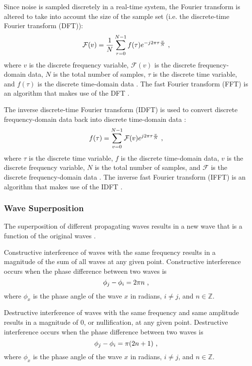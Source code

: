 \documentclass[11pt]{article}
\begin{document}
Since noise is sampled discretely in a real-time system, the Fourier transform is altered to take into account the size of the sample set (i.e. the discrete-time Fourier transform (DFT)):
\begin{equation}
    \mathcal{F}(v) = \frac{1}{N} \sum \limits_{\tau = 0}^{N - 1} f(\tau) e^{-j 2 \pi \tau \frac{v}{N}} \text{ ,}
\end{equation}
where $v$ is the discrete frequency variable, $\mathcal{F}(v)$ is the discrete frequency-domain data, $N$ is the total number of samples, $\tau$ is the discrete time variable, and $f(\tau)$ is the discrete time-domain data \cite{bracewell}. The fast Fourier transform (FFT) is an algorithm that makes use of the DFT \cite{bracewell}.

The inverse discrete-time Fourier transform (IDFT) is used to convert discrete frequency-domain data back into discrete time-domain data \cite{bracewell}:
\begin{equation}
    f(\tau) = \sum \limits_{v = 0}^{N - 1} \mathcal{F}(v) e^{j 2 \pi \tau \frac{v}{N}} \text{ ,}
\end{equation}
where $\tau$ is the discrete time variable, $f$ is the discrete time-domain data, $v$ is the discrete frequency variable, $N$ is the total number of samples, and $\mathcal{F}$ is the discrete frequency-domain data \cite{bracewell}. The inverse fast Fourier transform (IFFT) is an algorithm that makes use of the IDFT \cite{bracewell}.

\subsubsection{Wave Superposition}

The superposition of different propagating waves results in a new wave that is a function of the original waves \cite{roy}.

Constructive interference of waves with the same frequency results in a magnitude of the sum of all waves at any given point. Constructive interference occurs when the phase difference between two waves is
\begin{equation}
    \phi_j - \phi_i = 2 \pi n \text{ ,}
\end{equation}
where $\phi_x$ is the phase angle of the wave $x$ in radians, $i \neq j$, and $n \in \mathbb{Z}$.

Destructive interference of waves with the same frequency and same amplitude results in a magnitude of $0$, or nullification, at any given point. Destructive interference occurs when the phase difference between two waves is
\begin{equation}
    \phi_j - \phi_i = \pi (2n + 1) \text{ ,}
\end{equation}
where $\phi_x$ is the phase angle of the wave $x$ in radians, $i \neq j$, and $n \in \mathbb{Z}$.
\end{document}
